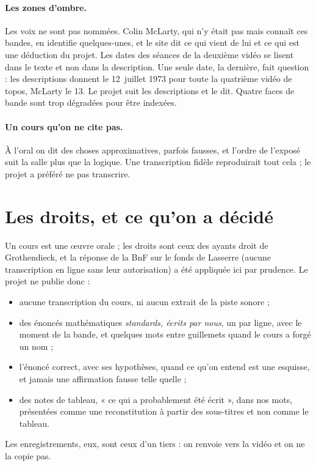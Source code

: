 \paragraph{Les zones d'ombre.} Les voix ne sont pas nommées. Colin McLarty, qui n'y était
pas mais connaît ces bandes, en identifie quelques-unes, et le site dit ce qui
vient de lui et ce qui est une déduction du projet. Les dates des séances de la deuxième
vidéo se lisent dans le texte et non dans la description. Une seule date, la dernière,
fait question : les descriptions donnent le 12~juillet 1973 pour toute la quatrième vidéo
de topos, McLarty le 13. Le projet suit les descriptions et le dit. Quatre faces de bande
sont trop dégradées pour être indexées.

\paragraph{Un cours qu'on ne cite pas.} À l'oral on dit des choses approximatives, parfois fausses,
et l'ordre de l'exposé suit la salle plus que la logique. Une transcription fidèle
reproduirait tout cela ; le projet a préféré ne pas transcrire.

\section{Les droits, et ce qu'on a décidé}

Un cours est une œuvre orale ; les droits sont ceux des ayants droit de Grothendieck, et
la réponse de la BnF sur le fonds de Lasserre (aucune transcription en ligne sans leur
autorisation) a été appliquée ici par prudence. Le projet ne publie donc :
\begin{itemize}
  \item aucune transcription du cours, ni aucun extrait de la piste sonore ;
  \item des énoncés mathématiques \emph{standards, écrits par nous}, un par ligne, avec le
        moment de la bande, et quelques mots entre guillemets quand le cours a forgé un
        nom ;
  \item l'énoncé correct, avec ses hypothèses, quand ce qu'on entend est une esquisse, et
        jamais une affirmation fausse telle quelle ;
  \item des notes de tableau, « ce qui a probablement été écrit », dans nos mots, présentées
        comme une reconstitution à partir des sous-titres et non comme le tableau.
\end{itemize}
Les enregistrements, eux, sont ceux d'un tiers : on renvoie vers la vidéo et on ne la copie
pas.

